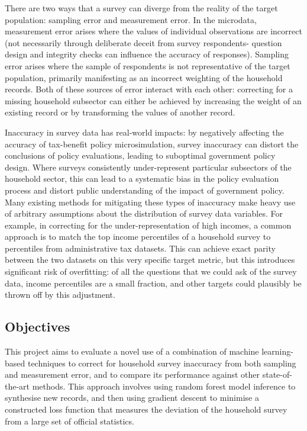 \documentclass[10pt,journal,compsoc]{IEEEtran}
\begin{document}
There are two ways that a survey can diverge from the reality of the target population: sampling error and measurement error. In the microdata, measurement error arises where the values of individual observations are incorrect (not necessarily through deliberate deceit from survey respondents- question design and integrity checks can influence the accuracy of responses). Sampling error arises where the sample of respondents is not representative of the target population, primarily manifesting as an incorrect weighting of the household records. Both of these sources of error interact with each other: correcting for a missing household subsector can either be achieved by increasing the weight of an existing record or by transforming the values of another record.

Inaccuracy in survey data has real-world impacts: by negatively affecting the accuracy of tax-benefit policy microsimulation, survey inaccuracy can distort the conclusions of policy evaluations, leading to suboptimal government policy design. Where surveys consistently under-represent particular subsectors of the household sector, this can lead to a systematic bias in the policy evaluation process and distort public understanding of the impact of government policy. Many existing methods for mitigating these types of inaccuracy make heavy use of arbitrary assumptions about the distribution of survey data variables. For example, in correcting for the under-representation of high incomes, a common approach is to match the top income percentiles of a household survey to percentiles from administrative tax datasets. This can achieve exact parity between the two datasets on this very specific target metric, but this introduces significant risk of overfitting: of all the questions that we could ask of the survey data, income percentiles are a small fraction, and other targets could plausibly be thrown off by this adjustment.

\subsection{Objectives}

This project aims to evaluate a novel use of a combination of machine learning-based techniques to correct for household survey inaccuracy from both sampling and measurement error, and to compare its performance against other state-of-the-art methods. This approach involves using random forest model inference to synthesise new records, and then using gradient descent to minimise a constructed loss function that measures the deviation of the household survey from a large set of official statistics.
\end{document}
